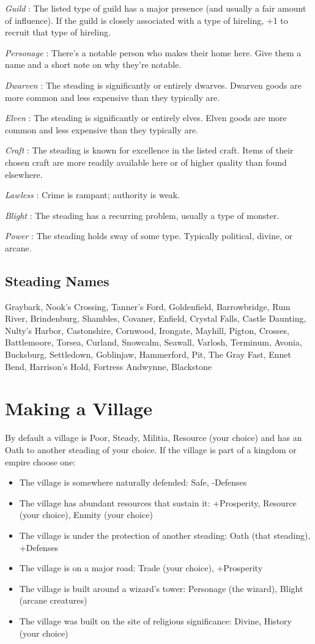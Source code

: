  \emph{Guild}
: The listed type of guild has a major presence (and usually a fair amount of influence). If the guild is closely associated with a type of hireling, +1 to recruit that type of hireling.


 \emph{Personage}
: There's a notable person who makes their home here. Give them a name and a short note on why they're notable.


 \emph{Dwarven}
: The steading is significantly or entirely dwarves. Dwarven goods are more common and less expensive than they typically are.


 \emph{Elven}
: The steading is significantly or entirely elves. Elven goods are more common and less expensive than they typically are.


 \emph{Craft}
: The steading is known for excellence in the listed craft. Items of their chosen craft are more readily available here or of higher quality than found elsewhere. 


 \emph{Lawless}
: Crime is rampant; authority is weak.


 \emph{Blight}
: The steading has a recurring problem, usually a type of monster.


 \emph{Power}
: The steading holds sway of some type. Typically political, divine, or arcane.
\subsection{Steading Names}


 Graybark, Nook's Crossing, Tanner's Ford, Goldenfield, Barrowbridge, Rum River, Brindenburg, Shambles, Covaner, Enfield, Crystal Falls, Castle Daunting, Nulty's Harbor, Castonshire, Cornwood, Irongate, Mayhill, Pigton, Crosses, Battlemoore, Torsea, Curland, Snowcalm, Seawall, Varlosh, Terminum, Avonia, Bucksburg, Settledown, Goblinjaw, Hammerford, Pit, The Gray Fast, Ennet Bend, Harrison's Hold, Fortress Andwynne, Blackstone
\section{Making a Village}


 By default a village is Poor, Steady, Militia, Resource (your choice) and has an Oath to another steading of your choice. If the village is part of a kingdom or empire choose one:
\begin{itemize}
\item The village is somewhere naturally defended: Safe, -Defenses
\item The village has abundant resources that sustain it: +Prosperity, Resource (your choice), Enmity (your choice)
\item The village is under the protection of another steading: Oath (that steading), +Defenses
\item The village is on a major road: Trade (your choice), +Prosperity
\item The village is built around a wizard's tower: Personage (the wizard), Blight (arcane creatures)
\item The village was built on the site of religious significance: Divine, History (your choice)

\end{itemize}


